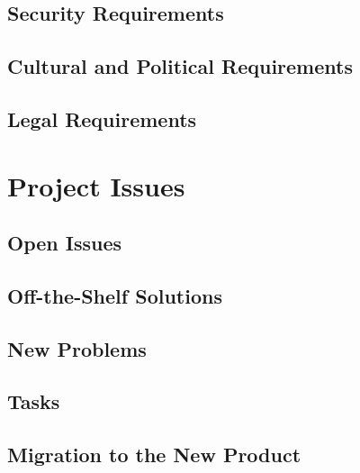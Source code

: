 \documentclass[notitlepage]{article}
\begin{document}
\begin{flushleft}
\subsection{Security Requirements}

\subsection{Cultural and Political Requirements}

\subsection{Legal Requirements}


\section{Project Issues}

\subsection{Open Issues}

\subsection{Off-the-Shelf Solutions}

\subsection{New Problems}

\subsection{Tasks}

\subsection{Migration to the New Product}


\end{flushleft}
\end{document}

